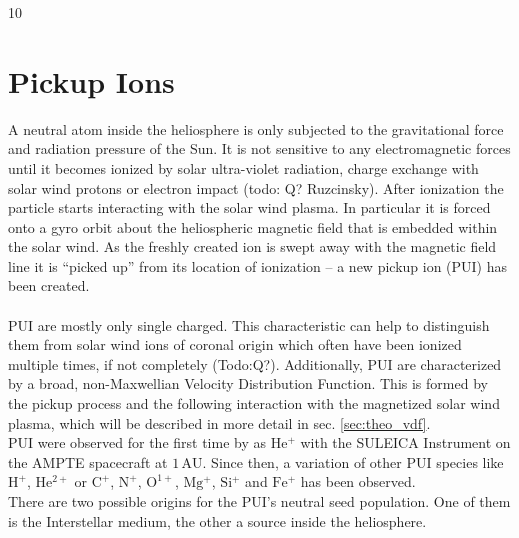 10%

\chapter{Pickup Ions} %

\label{chapter:theory} %







A neutral atom inside the heliosphere is only subjected to the gravitational force and radiation pressure of the Sun. It is not sensitive to any electromagnetic forces until it becomes ionized by solar ultra-violet radiation, charge exchange with solar wind protons or electron impact (todo: Q? Ruzcinsky). After ionization the particle starts interacting with the solar wind plasma. In particular it is forced onto a gyro orbit about the heliospheric magnetic field that is embedded within the solar wind. As the freshly created ion is swept away with the magnetic field line it is ``picked up'' from its location of ionization -- a new pickup ion (PUI) has been created.
\\ \\
PUI are mostly only single charged. This characteristic can help to distinguish them from solar wind ions of coronal origin which often have been ionized multiple times, if not completely (Todo:Q?). Additionally, PUI are characterized by a broad, non-Maxwellian Velocity Distribution Function. This is formed by the pickup process and the following interaction with the magnetized solar wind plasma, which will be described in more detail in sec. \ref{sec:theo_vdf}.\\
PUI were observed for the first time by \citet{moebius_nature_85} as $\mathrm{He^{+}}$ with the SULEICA Instrument on the AMPTE spacecraft at $1\,\mathrm{AU}$. Since then, a variation of other PUI species like $\mathrm{H^{+}}$, $\mathrm{He^{2+}}$ or $\mathrm{C^{+}}$, $\mathrm{N^{+}}$, $\mathrm{O^{1+}}$, $\mathrm{Mg^{+}}$, $\mathrm{Si^{+}}$ and $\mathrm{Fe^{+}}$ has been observed.\\
There are two possible origins for the PUI's neutral seed population. One of them is the Interstellar medium, the other a source inside the heliosphere.
